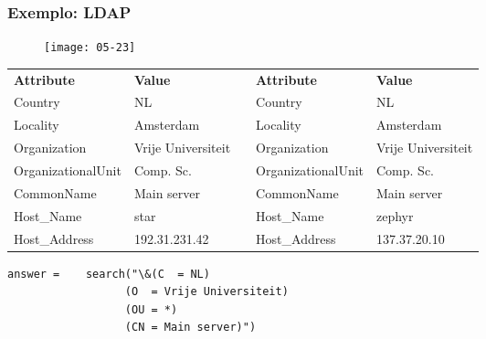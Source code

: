 \documentclass[Ligatures=TeX,table,brazil,svgnames,usetotalslideindicator,compress,10pt]{beamer}
\begin{document}
\begin{frame}[fragile]
  \frametitle{Exemplo: LDAP}
  \begin{figure}
    \centering
    \texttt{[image: 05-23]}
  \end{figure}

  \begin{center}\tiny
    \renewcommand{\arraystretch}{1.5}
    \begin{tabular}{|l|l|c|l|l|} \cline{1-2}\cline{4-5}
      \alert{\textbf{Attribute}} & \alert{\textbf{Value}} & & \alert{\textbf{Attribute}} & \alert{\textbf{Value}} \\ \cline{1-2}\cline{4-5}
      Country & NL & & Country & NL \\ \cline{1-2}\cline{4-5}
      Locality & Amsterdam & & Locality & Amsterdam \\ \cline{1-2}\cline{4-5}
      Organization & Vrije Universiteit & & Organization & Vrije Universiteit \\ \cline{1-2}\cline{4-5}
      OrganizationalUnit & Comp. Sc. & & OrganizationalUnit & Comp. Sc. \\ \cline{1-2}\cline{4-5}
      CommonName & Main server & & CommonName & Main server \\ \cline{1-2}\cline{4-5}
      Host\_Name & star & & Host\_Name & zephyr \\ \cline{1-2}\cline{4-5}
      Host\_Address & 192.31.231.42 & & Host\_Address & 137.37.20.10 \\ \cline{1-2}\cline{4-5}
    \end{tabular}
  \end{center}

  \small
\begin{verbatim}
answer =    search("\&(C  = NL)
                  (O  = Vrije Universiteit)
                  (OU = *)
                  (CN = Main server)")
\end{verbatim}

\end{frame}
\end{document}
